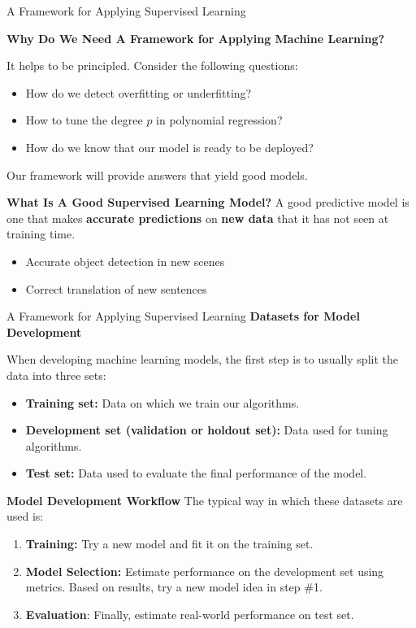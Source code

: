 \documentclass[../../main.tex]{subfiles}
\begin{document}
\begin{frame}[fragile]{A Framework for Applying Supervised Learning}

\textbf{Why Do We Need A Framework for Applying Machine Learning?}

It helps to be principled. Consider the following questions:
 \begin{itemize}
     \item How do we detect overfitting or underfitting?
     \item How to tune the degree $p$ in polynomial regression?
     \item How do we know that our model is ready to be deployed?
 \end{itemize}

Our framework will provide answers that yield good models.
\vspace{0.5cm}

\textbf{What Is A Good Supervised Learning Model?}
A good predictive model is one that makes \textbf{accurate predictions} on \textbf{new data} that it has not seen at training time.

\begin{itemize}
    \item Accurate object detection in new scenes
    \item Correct translation of new sentences
\end{itemize}


\end{frame}
\begin{frame}[fragile]{A Framework for Applying Supervised Learning}
\textbf{Datasets for Model Development}

When developing machine learning models, the first step is to usually split the data into three sets:

\begin{itemize}
    \item \textbf{Training set:} Data on which we train our algorithms.
    \item \textbf{Development set (validation or holdout set):} Data used for tuning algorithms.
    \item \textbf{Test set:} Data used to evaluate the final performance of the model.
\end{itemize}
\vspace{0.5cm}

\textbf{Model Development Workflow}
The typical way in which these datasets are used is:

\begin{enumerate}
    \item \textbf{Training:} Try a new model and fit it on the training set. 
    \item \textbf{Model Selection:} Estimate performance on the development set using metrics. Based on results, try a new model idea in step \#1.
    \item \textbf{Evaluation}: Finally, estimate real-world performance on test set.
\end{enumerate}

\end{frame}
\end{document}
